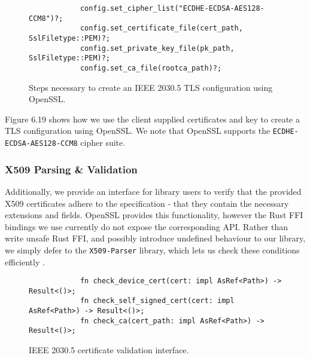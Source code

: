 \begin{figure}[h]
    \begin{center}
        \begin{lstlisting}
            config.set_cipher_list("ECDHE-ECDSA-AES128-CCM8")?;
            config.set_certificate_file(cert_path, SslFiletype::PEM)?;
            config.set_private_key_file(pk_path, SslFiletype::PEM)?;
            config.set_ca_file(rootca_path)?;
        \end{lstlisting}
        \label{fig:tlsconfigexample}
        \vspace{-10pt}
        \caption{Steps necessary to create an IEEE 2030.5 TLS configuration using OpenSSL.}
    \end{center}
\end{figure}

Figure 6.19 shows how we use the client supplied certificates and key to create a TLS configuration using OpenSSL. We note that OpenSSL supports the \texttt{ECDHE-ECDSA-AES128-CCM8} cipher suite.

\subsubsection{X509 Parsing \& Validation}
Additionally, we provide an interface for library users to verify that the provided X509 certificates adhere to the specification - that they contain the necessary extensions and fields. OpenSSL provides this functionality, however the Rust FFI bindings we use currently do not expose the corresponding API. Rather than write unsafe Rust FFI, and possibly introduce undefined behaviour to our library, we simply defer to the \texttt{X509-Parser} library, which lets us check these conditions efficiently \cite{x509parser}.

\begin{figure}[h]
    \begin{center}
        \begin{lstlisting}
            fn check_device_cert(cert: impl AsRef<Path>) -> Result<()>;
            fn check_self_signed_cert(cert: impl AsRef<Path>) -> Result<()>;
            fn check_ca(cert_path: impl AsRef<Path>) -> Result<()>;
        \end{lstlisting}
        \label{fig:certvalidinterface}
        \vspace{-10pt}
        \caption{IEEE 2030.5 certificate validation interface.}
    \end{center}
\end{figure}


